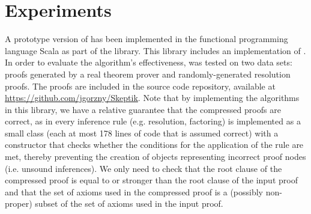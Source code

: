 \section{Experiments} \label{sec:exp}

A prototype version of {\FORPI} has been implemented in the functional programming language Scala as part of the \skeptik
library. This library includes an implementation of {\GFOLU} \cite{GFOLU}. In order to evaluate the algorithm's effectiveness, {\FORPI} was tested on two data sets: proofs generated by a real theorem prover and randomly-generated resolution proofs. The proofs are included in the source code repository, available at \url{https://github.com/jgorzny/Skeptik}. Note that by implementing the algorithms in this library, we have a relative guarantee that the compressed proofs are correct, as in \skeptik every inference rule (e.g. resolution, factoring) is implemented as a small class (each at most 178 lines of code that is assumed correct) with a constructor that checks whether the conditions for the application of the rule are met, thereby preventing the creation of objects representing incorrect proof nodes (i.e. unsound inferences). We only need to check that the root clause of the compressed proof is equal to or stronger than the root clause of the input proof and that the set of axioms used in the compressed proof is a (possibly non-proper) subset of the set of axioms used in the input proof.



